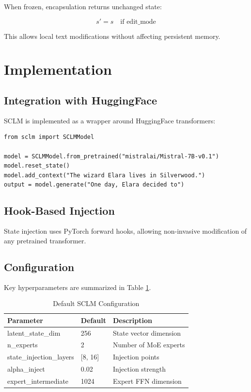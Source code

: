 \documentclass[11pt,a4paper]{article}
\begin{document}
When frozen, encapsulation returns unchanged state:

\begin{equation}
    s' = s \quad \text{if edit\_mode}
\end{equation}

This allows local text modifications without affecting persistent memory.

\section{Implementation}

\subsection{Integration with HuggingFace}

SCLM is implemented as a wrapper around HuggingFace transformers:

\begin{lstlisting}
from sclm import SCLMModel

model = SCLMModel.from_pretrained("mistralai/Mistral-7B-v0.1")
model.reset_state()
model.add_context("The wizard Elara lives in Silverwood.")
output = model.generate("One day, Elara decided to")
\end{lstlisting}

\subsection{Hook-Based Injection}

State injection uses PyTorch forward hooks, allowing non-invasive modification of any pretrained transformer.

\subsection{Configuration}

Key hyperparameters are summarized in Table \ref{tab:config}.

\begin{table}[h]
\centering
\caption{Default SCLM Configuration}
\label{tab:config}
\begin{tabular}{@{}lll@{}}
\toprule
\textbf{Parameter} & \textbf{Default} & \textbf{Description} \\
\midrule
latent\_state\_dim & 256 & State vector dimension \\
n\_experts & 2 & Number of MoE experts \\
state\_injection\_layers & [8, 16] & Injection points \\
alpha\_inject & 0.02 & Injection strength \\
expert\_intermediate & 1024 & Expert FFN dimension \\
\bottomrule
\end{tabular}
\end{table}
\end{document}
